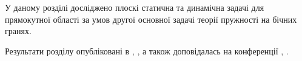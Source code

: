 У даному розділі досліджено плоскі статична та динамічна задачі для прямокутної області
за умов другої основної задачі теорії пружності на бічних гранях.



Результати розділу опубліковані в \cite{pozhylenkov_4}, \cite{pozhylenkov_6}, а також доповідалась на конференції \cite{conf_3}, \cite{conf_5}.